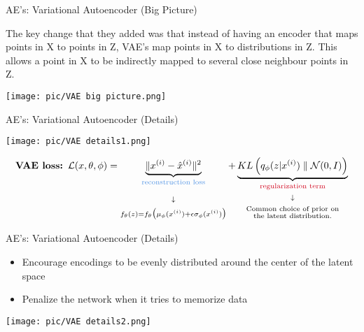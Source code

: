 \documentclass[serif, aspectratio=169]{beamer}
\begin{document}
\begin{frame}{AE’s: Variational Autoencoder (Big Picture)}
    \begin{center}
        \small The key change that they added was that instead of having an encoder that maps points in X to points in Z, VAE’s map points in X to distributions in Z. This allows a point in X to be indirectly mapped to several close neighbour points in Z.

        \texttt{[image: pic/VAE big picture.png]}

    \end{center}
  
    
\end{frame}



\begin{frame}{AE's: Variational Autoencoder (Details)}
    \begin{center}
        \texttt{[image: pic/VAE details1.png]}
    \end{center}
    \scriptsize
    \begin{equation*}
        \textbf{VAE loss: } \mathcal{L}(x, \theta, \phi) = 
        \underbrace{
            \| x^{(i)} - \hat{x}^{(i)} \|^2
        }_{\substack{
            \text{\textcolor[rgb]{0.29,0.56,0.89}{reconstruction loss}} \\ 
            \\
            \\
            \downarrow\\
            \\
            f_{\theta}(z) = f_{\theta} \big( \mu_{\phi}(x^{(i)}) + \epsilon \sigma_{\phi}(x^{(i)}) \big)
        }}
        + 
        \underbrace{
            KL\left( q_{\phi}(z | x^{(i)}) \parallel \mathcal{N}(0, I) \right)
        }_{\substack{
            \text{\textcolor[rgb]{0.82,0.01,0.11}{regularization term}} \\ 
            \\
            \downarrow\\
            \\
            \text{Common choice of prior on} \\
            \text{the latent distribution.}
        }}
    \end{equation*}

\end{frame}

\begin{frame}{AE's: Variational Autoencoder (Details)}
    \begin{itemize}
        \item Encourage encodings to be evenly distributed around the center of the latent space
        \item Penalize the network when it tries to memorize data
    \end{itemize}
    
    \begin{center}
        \texttt{[image: pic/VAE details2.png]}
    \end{center}
\end{frame}
\end{document}
